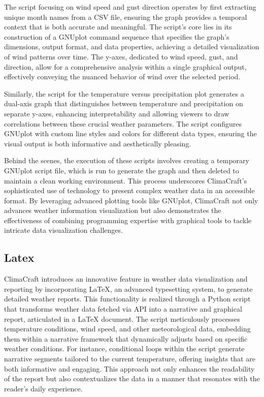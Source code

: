 \documentclass[sn-mathphys-num]{sn-jnl}%
\begin{document}
The script focusing on wind speed and gust direction operates by first extracting unique month names from a CSV file, ensuring the graph provides a temporal context that is both accurate and meaningful. The script's core lies in its construction of a GNUplot command sequence that specifies the graph's dimensions, output format, and data properties, achieving a detailed visualization of wind patterns over time. The y-axes, dedicated to wind speed, gust, and direction, allow for a comprehensive analysis within a single graphical output, effectively conveying the nuanced behavior of wind over the selected period.

Similarly, the script for the temperature versus precipitation plot generates a dual-axis graph that distinguishes between temperature and precipitation on separate y-axes, enhancing interpretability and allowing viewers to draw correlations between these crucial weather parameters. The script configures GNUplot with custom line styles and colors for different data types, ensuring the visual output is both informative and aesthetically pleasing.

Behind the scenes, the execution of these scripts involves creating a temporary GNUplot script file, which is run to generate the graph and then deleted to maintain a clean working environment. This process underscores ClimaCraft's sophisticated use of technology to present complex weather data in an accessible format. By leveraging advanced plotting tools like GNUplot, ClimaCraft not only advances weather information visualization but also demonstrates the effectiveness of combining programming expertise with graphical tools to tackle intricate data visualization challenges.

\subsection{Latex}\label{sec3.4}

ClimaCraft introduces an innovative feature in weather data visualization and reporting by incorporating LaTeX, an advanced typesetting system, to generate detailed weather reports. This functionality is realized through a Python script that transforms weather data fetched via API into a narrative and graphical report, articulated in a LaTeX document. The script meticulously processes temperature conditions, wind speed, and other meteorological data, embedding them within a narrative framework that dynamically adjusts based on specific weather conditions. For instance, conditional loops within the script generate narrative segments tailored to the current temperature, offering insights that are both informative and engaging. This approach not only enhances the readability of the report but also contextualizes the data in a manner that resonates with the reader's daily experience.
\end{document}
